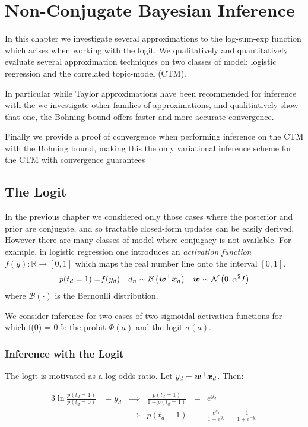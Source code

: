 


\section{Non-Conjugate Bayesian Inference}
\label{sec:nonconj}
In this chapter we investigate several approximations to the log-sum-exp function which arises when working with the logit. We qualitatively and quantitatively evaluate several approximation techniques on two classes of model: logistic regression and the correlated topic-model (CTM).

In particular while Taylor approximations have been recommended for inference with the \cite{Wang2013} we investigate other families of approximations, and qualitiatively show that one, the Bohning bound\cite{Bohning1988} offers faster and more accurate convergence. 

Finally we provide a proof of convergence when performing inference on the CTM with the Bohning bound, making this the only variational inference scheme for the CTM with convergence guarantees
\subsection{The Logit}
In the previous chapter we considered only those cases where the posterior and prior are conjugate, and so tractable closed-form updates can be easily derived. However there are many classes of model where conjugacy is not available. For example, in logistic regression one introduces an \emph{activation function} $f(y) : \mathbb{R} \rightarrow [0, 1]$ which maps the real number line onto the interval $[0,1]$.
\begin{align*}
p(t_d = 1) = & f(y_d) & d_n  & \sim \mathcal{B} \left( \bm w^\top\bm x_d\right) & \bm w & \sim \mathcal{N} \left( {0}, {\alpha^2 I} \right) \\
\end{align*}
where $\mathcal{B}(\cdot)$ is the Bernoulli distribution.

We consider inference for two cases of two sigmoidal activation functions for which f(0) = 0.5: the probit $\Phi(a)$ and the logit $\sigma(a)$.

\subsubsection{Inference with the Logit}
The logit is motivated as a log-odds ratio. Let $y_d = \bm w^\top\bm x_d$. Then:

\begin{alignat}{3}
\ln \frac{p(t_d = 1)}{p(t_d = 0)}  & = y_d  &
\implies & \frac{p(t_d = 1)}{1 - p(t_d = 1)}  & = & e^{y_d} \\
& & \implies &  p(t_d = 1)                    & = & \frac{e^{y_d}}{1 + e^{y_d}} = \frac{1}{1+e^{-y_d}}
\end{alignat}

